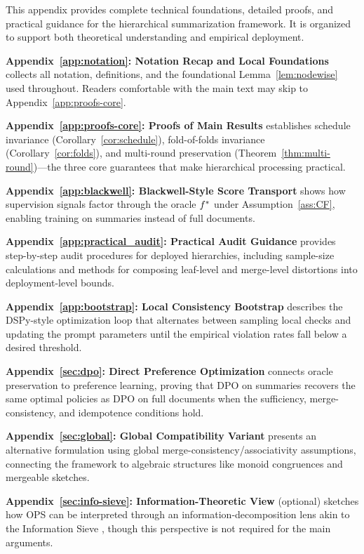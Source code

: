 \appendix

\noindent This appendix provides complete technical foundations, detailed proofs, and practical guidance for the hierarchical summarization framework. It is organized to support both theoretical understanding and empirical deployment.

\medskip
\noindent\textbf{Appendix~\ref{app:notation}: Notation Recap and Local Foundations} collects all notation, definitions, and the foundational Lemma~\ref{lem:nodewise} used throughout. Readers comfortable with the main text may skip to Appendix~\ref{app:proofs-core}.

\noindent\textbf{Appendix~\ref{app:proofs-core}: Proofs of Main Results} establishes schedule invariance (Corollary~\ref{cor:schedule}), fold-of-folds invariance (Corollary~\ref{cor:folds}), and multi-round preservation (Theorem~\ref{thm:multi-round})—the three core guarantees that make hierarchical processing practical.

\noindent\textbf{Appendix~\ref{app:blackwell}: Blackwell-Style Score Transport} shows how supervision signals factor through the oracle $f^{\ast}$ under Assumption~\ref{ass:CF}, enabling training on summaries instead of full documents.

\noindent\textbf{Appendix~\ref{app:practical_audit}: Practical Audit Guidance} provides step-by-step audit procedures for deployed hierarchies, including sample-size calculations and methods for composing leaf-level and merge-level distortions into deployment-level bounds.

\noindent\textbf{Appendix~\ref{app:bootstrap}: Local Consistency Bootstrap} describes the DSPy-style optimization loop that alternates between sampling local checks and updating the prompt parameters until the empirical violation rates fall below a desired threshold.

\noindent\textbf{Appendix~\ref{sec:dpo}: Direct Preference Optimization} connects oracle preservation to preference learning, proving that DPO on summaries recovers the same optimal policies as DPO on full documents when the sufficiency, merge-consistency, and idempotence conditions hold.

\noindent\textbf{Appendix~\ref{sec:global}: Global Compatibility Variant} presents an alternative formulation using global merge-consistency/associativity assumptions, connecting the framework to algebraic structures like monoid congruences and mergeable sketches.

\noindent\textbf{Appendix~\ref{sec:info-sieve}: Information-Theoretic View} (optional) sketches how OPS can be interpreted through an information-decomposition lens akin to the Information Sieve \citep{steeg2016informationsieve}, though this perspective is not required for the main arguments.

